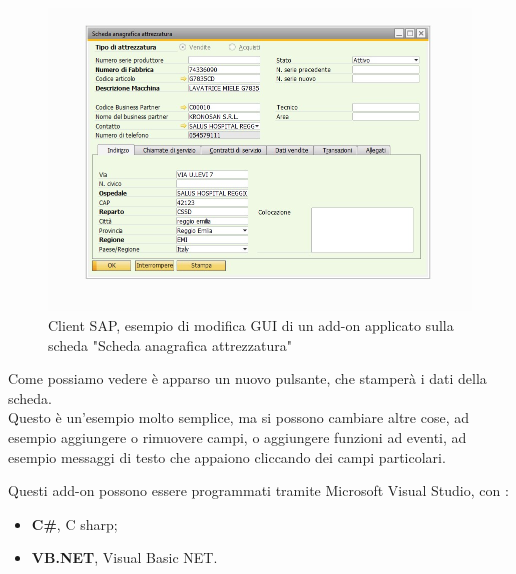 \pagebreak
\begin{figure}[!h] 
	\centering 
	\includegraphics[scale = 0.6]{immagini/esempio-modifica-client-addon.jpg} 
	\caption {Client SAP, esempio di modifica GUI di un add-on applicato sulla scheda "Scheda anagrafica attrezzatura"}
\end{figure}
\begin{flushleft}
	\item Come possiamo vedere è apparso un nuovo pulsante, che stamperà i dati della scheda.\\Questo è un'esempio molto semplice, ma si possono cambiare altre cose, ad esempio aggiungere o rimuovere campi, o aggiungere funzioni ad eventi, ad esempio messaggi di testo che appaiono cliccando dei campi particolari.
	\item Questi add-on possono essere programmati tramite Microsoft Visual Studio, con :
	\begin{itemize}
		\item \textbf{C\#}, C sharp;
		\item \textbf{VB.NET}, Visual Basic NET.
	\end{itemize}
\end{flushleft}
\newpage
